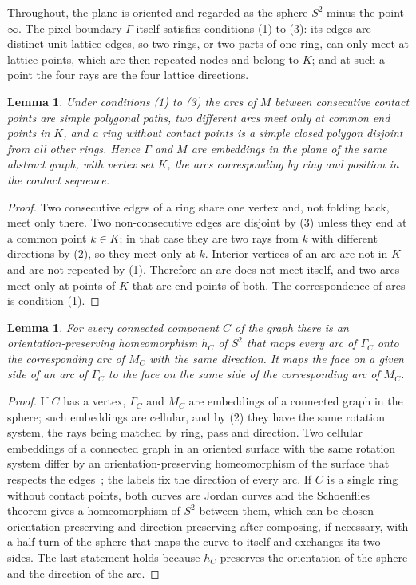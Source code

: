 \documentclass[11pt,a4paper]{article}
\newtheorem{lemma}[theorem]{Lemma}
\theoremstyle{definition}
\theoremstyle{remark}
\begin{document}
Throughout, the plane is oriented and regarded as the sphere $S^2$ minus the
point $\infty$. The pixel boundary $\Gamma$ itself satisfies conditions (1)
to (3): its edges are distinct unit lattice edges, so two rings, or two parts
of one ring, can only meet at lattice points, which are then repeated nodes
and belong to $K$; and at such a point the four rays are the four lattice
directions.

\begin{lemma}\label{lem:planegraph}
Under conditions (1) to (3) the arcs of $M$ between consecutive contact points
are simple polygonal paths, two different arcs meet only at common end points
in $K$, and a ring without contact points is a simple closed polygon disjoint
from all other rings. Hence $\Gamma$ and $M$ are embeddings in the plane of
the same abstract graph, with vertex set $K$, the arcs corresponding by ring
and position in the contact sequence.
\end{lemma}
\begin{proof}
Two consecutive edges of a ring share one vertex and, not folding back, meet
only there. Two non-consecutive edges are disjoint by (3) unless they end at
a common point $k\in K$; in that case they are two rays from $k$ with
different directions by (2), so they meet only at $k$. Interior vertices of
an arc are not in $K$ and are not repeated by (1). Therefore an arc does not
meet itself, and two arcs meet only at points of $K$ that are end points of
both. The correspondence of arcs is condition (1).
\end{proof}

\begin{lemma}\label{lem:sphere}
For every connected component $C$ of the graph there is an
orientation-preserving homeomorphism $h_C$ of $S^2$ that maps every arc of
$\Gamma_C$ onto the corresponding arc of $M_C$ with the same direction. It
maps the face on a given side of an arc of $\Gamma_C$ to the face on the same
side of the corresponding arc of $M_C$.
\end{lemma}
\begin{proof}
If $C$ has a vertex, $\Gamma_C$ and $M_C$ are embeddings of a connected graph
in the sphere; such embeddings are cellular, and by (2) they have the same
rotation system, the rays being matched by ring, pass and direction. Two
cellular embeddings of a connected graph in an oriented surface with the same
rotation system differ by an orientation-preserving homeomorphism of the
surface that respects the edges~\cite[Section~3.2]{mohar2001}; the labels fix
the direction of every arc. If $C$ is a single ring without contact points,
both curves are Jordan curves and the Schoenflies theorem gives a
homeomorphism of $S^2$ between them, which can be chosen orientation
preserving and direction preserving after composing, if necessary, with a
half-turn of the sphere that maps the curve to itself and exchanges its two
sides. The last statement holds because $h_C$ preserves the orientation of
the sphere and the direction of the arc.
\end{proof}
\end{document}
